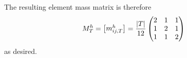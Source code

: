 \begin{problem}{1}
\begin{solution}
The resulting element mass matrix is therefore
\begin{align*}
M_T^h
= \begin{bmatrix}
m_{ij,T}^h
\end{bmatrix}
= \frac{\left| T \right|}{12}
\begin{pmatrix}
2 & 1 & 1 \\ 
1 & 2 & 1 \\ 
1 & 1 & 2
\end{pmatrix}
\end{align*}
as desired.

\end{solution}
\pagebreak

\end{problem} %
\pagebreak


